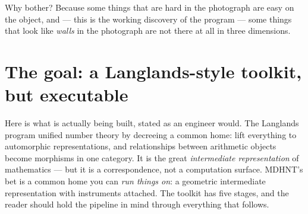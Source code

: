 \documentclass[11pt]{article}
\begin{document}
Why bother?  Because some things that are hard in the photograph are easy on the
object, and --- this is the working discovery of the program --- some things that
look like \emph{walls} in the photograph are not there at all in three dimensions.

\section{The goal: a Langlands-style toolkit, but executable}

Here is what is actually being built, stated as an engineer would.  The Langlands
program unified number theory by decreeing a common home: lift everything to
automorphic representations, and relationships between arithmetic objects become
morphisms in one category.  It is the great \emph{intermediate representation} of
mathematics --- but it is a correspondence, not a computation surface.  MDHNT's
bet is a common home you can \emph{run things on}: a geometric intermediate
representation with instruments attached.  The toolkit has five stages, and the
reader should hold the pipeline in mind through everything that follows.
\end{document}
